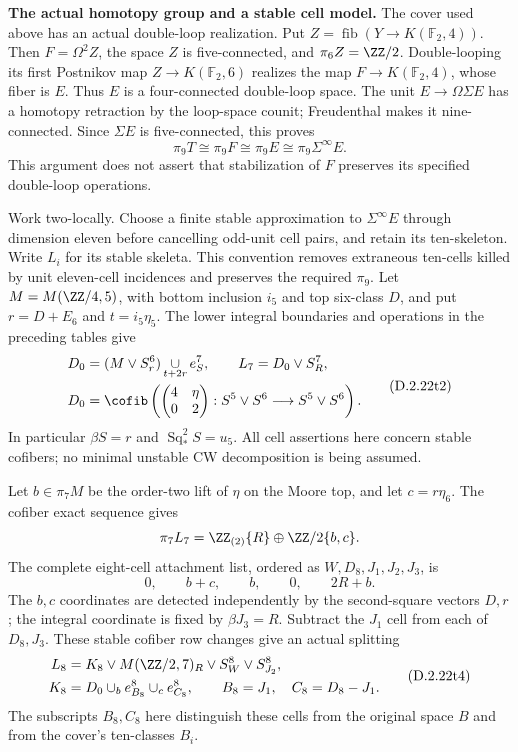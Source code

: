 \medskip\noindent
\textbf{The actual homotopy group and a stable cell model.}
The cover used above has an actual double-loop realization.
Put $Z=\operatorname{fib}(Y\to K(\mathbb F _2,4))$.
Then $F=\Omega^2Z$, the space $Z$ is five-connected, and
$\pi_6Z=\ZZ/2$.  Double-looping its first Postnikov map
$Z\to K(\mathbb F _2,6)$ realizes the map
$F\to K(\mathbb F _2,4)$, whose fiber is $E$.
Thus $E$ is a four-connected double-loop space.
The unit $E\to\Omega\Sigma E$ has a homotopy retraction by
the loop-space counit; Freudenthal makes it nine-connected.
Since $\Sigma E$ is five-connected, this proves
\[
 \pi_9T\cong\pi_9F\cong\pi_9E
       \cong\pi_9\Sigma^\infty E.
 \tag{D.2.22t1}
\]
This argument does not assert that stabilization of $F$ preserves
its specified double-loop operations.

Work two-locally.  Choose a finite stable approximation to
$\Sigma^\infty E$ through dimension eleven before cancelling
odd-unit cell pairs, and retain its ten-skeleton.
Write $L_i$ for its stable skeleta.  This convention removes
extraneous ten-cells killed by unit eleven-cell incidences and
preserves the required $\pi_9$.
Let $M=M(\ZZ/4,5)$, with bottom inclusion $i_5$ and top
six-class $D$, and put $r=D+E_6$ and $t=i_5\eta_5$.
The lower integral boundaries and operations in the preceding
tables give
\[
 \begin{split}
 D_0&=(M\vee S^6_r)\mathop{\cup}_{t+2r}e^7_S,
       \qquad L_7=D_0\vee S^7_R,\\
 D_0&=\cofib\left(
 \begin{pmatrix}4&\eta\\0&2\end{pmatrix}:
 S^5\vee S^6\longrightarrow S^5\vee S^6\right).
 \end{split}
 \tag{D.2.22t2}
\]
In particular $\beta S=r$ and $\operatorname{Sq}_*^2S=u_5$.
All cell assertions here concern stable cofibers; no minimal
unstable CW decomposition is being assumed.

Let $b\in\pi_7M$ be the order-two lift of $\eta$ on the
Moore top, and let $c=r\eta_6$.
The cofiber exact sequence gives
\[
 \pi_7L_7=\ZZ_{(2)}\{R\}\oplus
                    \ZZ/2\{b,c\}.
\]
The complete eight-cell attachment list, ordered as
$W,D_8,J_1,J_2,J_3$, is
\[
 0,\qquad b+c,\qquad b,\qquad0,\qquad2R+b.
 \tag{D.2.22t3}
\]
The $b,c$ coordinates are detected independently by the
second-square vectors $D,r$; the integral coordinate is fixed
by $\beta J_3=R$.
Subtract the $J_1$ cell from each of $D_8,J_3$.
These stable cofiber row changes give an actual splitting
\[
 \begin{split}
 L_8&=K_8\vee M(\ZZ/2,7)_R\vee S^8_W\vee S^8_{J_2},\\
 K_8&=D_0\cup_b e^8_{B_8}\cup_c e^8_{C_8},
       \qquad B_8=J_1,\quad C_8=D_8-J_1.
 \end{split}
 \tag{D.2.22t4}
\]
The subscripts $B_8,C_8$ here distinguish these cells from
the original space $B$ and from the cover's ten-classes $B_i$.

